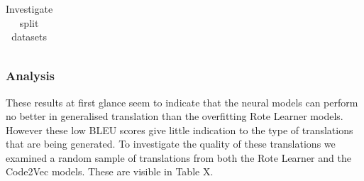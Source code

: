 \begin{table}[!ht]
\begin{center}
\begin{tabular}{ c | c | c }
    \hline
\end{tabular}
\caption {Investigate split datasets}
\label{table:split_datasets_embed}
\end{center}
\end{table}




\subsubsection{Analysis}

These results at first glance seem to indicate that the neural models can perform no better in generalised translation than the overfitting Rote Learner models.
However these low BLEU scores give little indication to the type of translations that are being generated.
To investigate the quality of these translations we examined a random sample of translations from both the Rote Learner and the Code2Vec models. 
These are visible in Table X.


